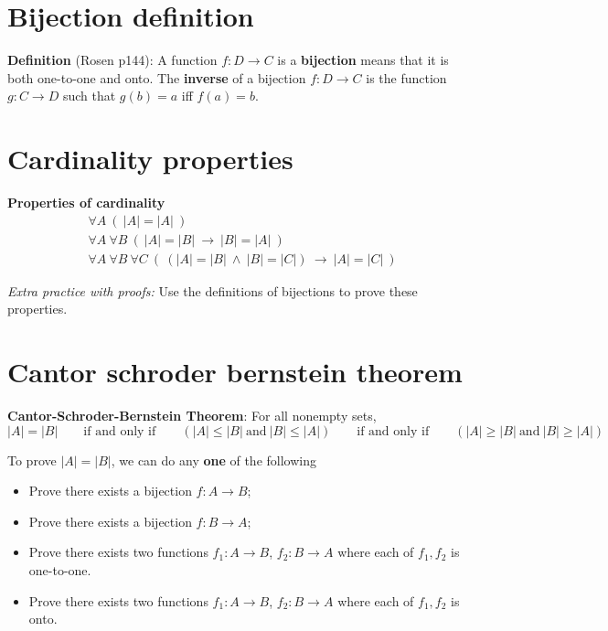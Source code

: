 \documentclass[12pt, oneside]{article}
\begin{document}
\section*{Bijection definition}


{\bf Definition}  (Rosen p144): A function $f: D  \to C$ is a {\bf bijection} means that it is both  one-to-one  and onto.
The {\bf inverse} of a  bijection $f: D  \to  C$ is  the function $g: C  \to  D$  such that $g(b) = a$ iff  $f(a) =  b$.


 \vfill
\section*{Cardinality properties}


{\bf Properties of cardinality}
\begin{align*}
&\forall A ~ (~  |A| = |A| ~)\\
&\forall A ~ \forall B ~(~ |A| = |B|  ~\to ~ |B| = |A|~)\\
&\forall A ~ \forall B ~ \forall C~ (~ (|A| = |B| ~\wedge~ |B| = |C|) ~\to ~ |A| = |C|~)
\end{align*}

{\it Extra practice with proofs:} Use the definitions of bijections to prove these properties. \vfill
\section*{Cantor schroder bernstein theorem}


{\bf Cantor-Schroder-Bernstein Theorem}: For all nonempty sets,
\[
|A| = |B| \qquad\text{if and only if} \qquad (|A| \leq |B| ~\text{and}~ |B| \leq |A|)
\qquad\text{if and only if} \qquad (|A| \geq |B| ~\text{and}~ |B| \geq |A|)
\]

To prove $|A| = |B|$,  we can do any {\bf one} of the following

\begin{itemize}\setlength{\itemsep}{-5pt}
\item Prove there exists  a bijection $f:  A \to B$;
\item Prove there exists a  bijection  $f: B  \to  A$;
\item Prove there exists two functions $f_1: A \to B$, $f_2: B \to  A$ where each of $f_1, f_2$ is one-to-one.
\item Prove there exists two functions $f_1: A \to B$, $f_2: B \to  A$ where each of $f_1, f_2$ is onto.
\end{itemize} \vfill
\end{document}
